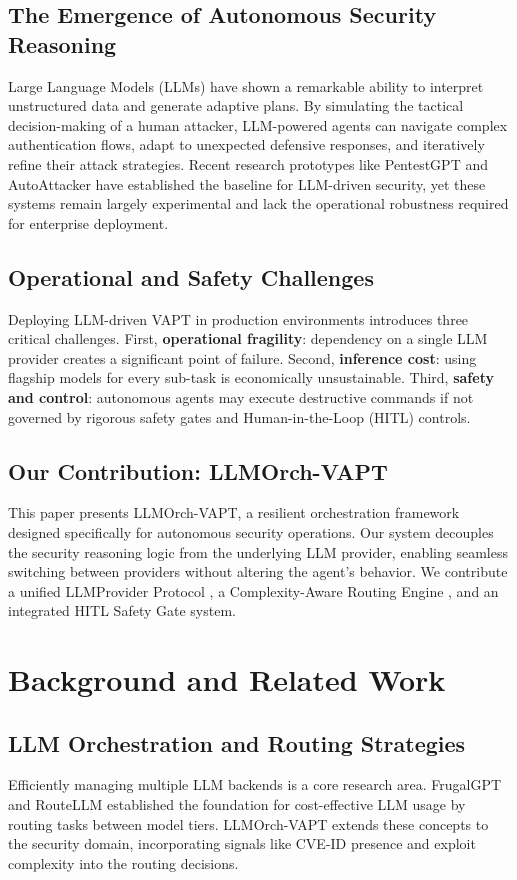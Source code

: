 \documentclass[conference,compsoc]{IEEEtran}
\begin{document}
\subsection{The Emergence of Autonomous Security Reasoning}
Large Language Models (LLMs) have shown a remarkable ability to interpret unstructured data and generate adaptive plans. By simulating the tactical decision-making of a human attacker, LLM-powered agents can navigate complex authentication flows, adapt to unexpected defensive responses, and iteratively refine their attack strategies. Recent research prototypes like PentestGPT \cite{pentestgpt} and AutoAttacker \cite{autoattacker} have established the baseline for LLM-driven security, yet these systems remain largely experimental and lack the operational robustness required for enterprise deployment.

\subsection{Operational and Safety Challenges}
Deploying LLM-driven VAPT in production environments introduces three critical challenges. First, \textbf{operational fragility}: dependency on a single LLM provider creates a significant point of failure. Second, \textbf{inference cost}: using flagship models for every sub-task is economically unsustainable. Third, \textbf{safety and control}: autonomous agents may execute destructive commands if not governed by rigorous safety gates and Human-in-the-Loop (HITL) controls.

\subsection{Our Contribution: LLMOrch-VAPT}
This paper presents LLMOrch-VAPT, a resilient orchestration framework designed specifically for autonomous security operations. Our system decouples the security reasoning logic from the underlying LLM provider, enabling seamless switching between providers without altering the agent's behavior. We contribute a unified LLMProvider Protocol \cite{litellm}, a Complexity-Aware Routing Engine \cite{routellm}, and an integrated HITL Safety Gate system.

\section{Background and Related Work}
\subsection{LLM Orchestration and Routing Strategies}
Efficiently managing multiple LLM backends is a core research area. FrugalGPT \cite{frugalgpt} and RouteLLM \cite{routellm} established the foundation for cost-effective LLM usage by routing tasks between model tiers. LLMOrch-VAPT extends these concepts to the security domain, incorporating signals like CVE-ID presence and exploit complexity into the routing decisions.
\end{document}
